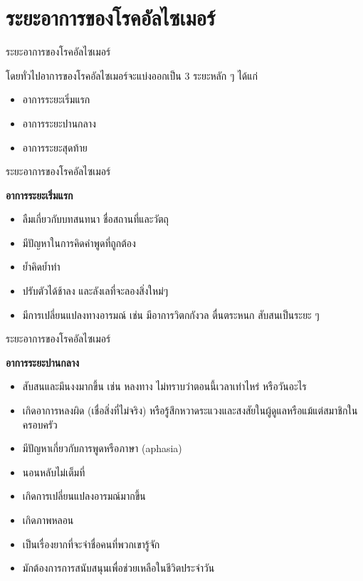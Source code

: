 \documentclass[xetex,serif]{beamer}
\begin{document}
\section{ระยะอาการของโรคอัลไซเมอร์}

\begin{frame}{ระยะอาการของโรคอัลไซเมอร์}

  {\large โดยทั่วไปอาการของโรคอัลไซเมอร์จะแบ่งออกเป็น 3 ระยะหลัก ๆ ได้แก่}

  \begin{itemize}
    \item อาการระยะเริ่มแรก 
    \item อาการระยะปานกลาง 
    \item อาการระยะสุดท้าย 
  \end{itemize}
\end{frame}

\begin{frame}{ระยะอาการของโรคอัลไซเมอร์}

  {\Large \textbf{อาการระยะเริ่มแรก}}

  \begin{itemize}
    \item ลืมเกี่ยวกับบทสนทนา ชื่อสถานที่และวัตถุ 
    \item มีปัญหาในการคิดคำพูดที่ถูกต้อง 
    \item ย้ำคิดย้ำทำ 
    \item ปรับตัวได้ช้าลง และลังเลที่จะลองสิ่งใหม่ๆ 
    \item มีการเปลี่ยนแปลงทางอารมณ์ เช่น มีอาการวิตกกังวล ตื่นตระหนก สับสนเป็นระยะ ๆ
  \end{itemize}
\end{frame}

\begin{frame}{ระยะอาการของโรคอัลไซเมอร์}

  {\Large \textbf{อาการระยะปานกลาง}}

  \begin{itemize}
    \item สับสนและมึนงงมากขึ้น เช่น หลงทาง ไม่ทราบว่าตอนนี้เวลาเท่าไหร่ หรือวันอะไร 
    \item เกิดอาการหลงผิด (เชื่อสิ่งที่ไม่จริง)  หรือรู้สึกหวาดระแวงและสงสัยในผู้ดูแลหรือแม้แต่สมาชิกในครอบครัว 
    \item มีปัญหาเกี่ยวกับการพูดหรือภาษา (aphasia) 
    \item นอนหลับไม่เต็มที่ 
    \item เกิดการเปลี่ยนแปลงอารมณ์มากขึ้น 
    \item เกิดภาพหลอน 
    \item เป็นเรื่องยากที่จะจำชื่อคนที่พวกเขารู้จัก 
    \item มักต้องการการสนับสนุนเพื่อช่วยเหลือในชีวิตประจำวัน
  \end{itemize}
\end{frame}
\end{document}

